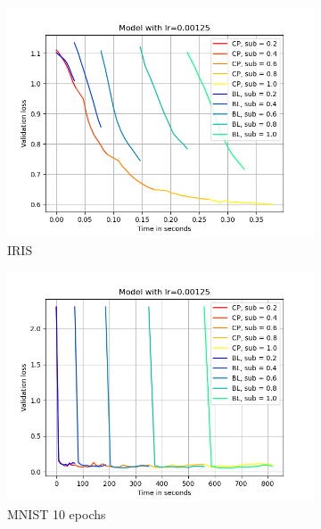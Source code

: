 \begin{figure}[h]
    \centering
    \begin{subfigure}[b]{0.24\textwidth}
        \centering
        \includegraphics[width=\textwidth]{figures/22_07/iris/loss_time_0.00125.png}
        \caption{IRIS}
        \label{fig:5a}
    \end{subfigure}
    \begin{subfigure}[b]{0.24\textwidth}
        \centering
        \includegraphics[width=\textwidth]{figures/22_07/10ep/loss_time_0.00125.png}
        \caption{MNIST 10 epochs}
        \label{fig:5b}
    \end{subfigure}
    \begin{subfigure}[b]{0.24\textwidth}

\end{subfigure}
\end{figure}
